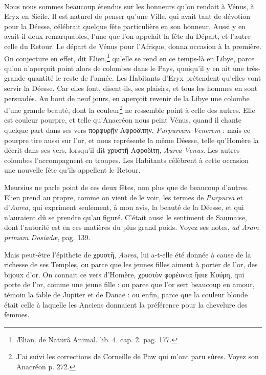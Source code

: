 \documentclass[a4paper, 18pt, oneside]{article}
\begin{document}
\paragraph{}
Nous nous sommes beaucoup étendus sur les honneurs qu'on rendait à Vénus, à Eryx en Sicile. Il est naturel de penser qu'une Ville, qui avait tant de dévotion pour la Déesse, célébrait quelque fête particulière en son honneur. Aussi y en avait-il deux remarquables, l'une que l'on appelait la fête du Départ, et l'autre celle du Retour. Le départ de Vénus pour l'Afrique, donna occasion à la première. On conjecture en effet, dit Elien,\footnote{Ælian. de Naturâ Animal. lib. 4. cap. 2. pag. 177.} qu'elle se rend en ce temps-là en Libye, parce qu'on n'aperçoit point alors de colombes dans le Pays, quoiqu'il y en ait une très-grande quantité le reste de l'année. Les Habitants d'Eryx prétendent qu'elles vont servir la Déesse. Car elles font, disent-ils, ses plaisirs, et tous les hommes en sont persuadés. Au bout de neuf jours, en aperçoit revenir de la Libye une colombe d'une grande beauté, dont la couleur\footnote{J'ai suivi les corrections de Corneille de Paw qui m'ont paru sûres. Voyez son Anacréon p. 272.} ne ressemble point à celle des autres. Elle est couleur pourpre, et telle qu'Anacréon nous peint Vénus, quand il chante quelque part dans ses vers πορφυρῇν Αφροδίτην, \emph{Purpuream Venerem} : mais ce pourpre tire aussi sur l'or, et nous représente la même Déesse, telle qu'Homère la décrit dans ses vers, lorsqu'il dit χρυστῆ Αφροδίτη, \emph{Aurea Venus}. Les autres colombes l'accompagnent en troupes. Les Habitants célèbrent à cette occasion une nouvelle fête qu'ils appellent le Retour.

Meursius ne parle point de ces deux fêtes, non plus que de beaucoup d'autres. Elien prend au propre, comme on vient de le voir, les termes de \emph{Purpurea} et d'\emph{Aurea}, qui expriment seulement, à mon avis, la beauté de la Déesse, et qui n'auraient dû se prendre qu'au figuré. C'était aussi le sentiment de Saumaise, dont l'autorité est en ces matières du plus grand poids. Voyez ses notes, \emph{ad Aram primam Dosiadæ}, pag. 139.

Mais peut-être l'épithete de χρυστῆ, \emph{Aurea}, lui a-t-elle été donnée à cause de la richesse de ses Temples, ou parce que les jeunes filles aiment à porter de l'or, des bijoux d'or. On connait ce vers d'Homère, χρυστὸν φορέοντα ἤυτε Κούρη, qui porte de l'or, comme une jeune fille : ou parce que l'or sert beaucoup en amour, témoin la fable de Jupiter et de Danaë : ou enfin, parce que la couleur blonde était celle à laquelle les Anciens donnaient la préférence pour la chevelure des femmes.
\end{document}
